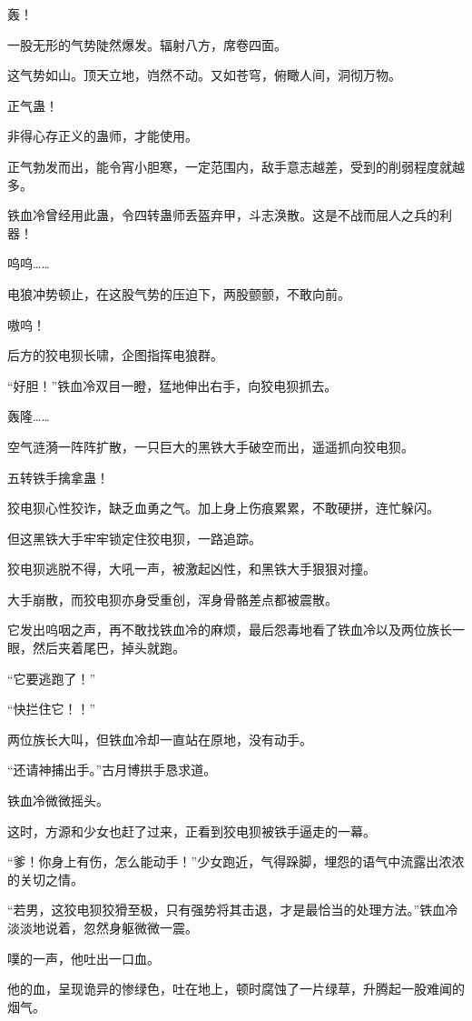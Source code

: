 \begin{this_body}
轰！

一股无形的气势陡然爆发。辐射八方，席卷四面。

这气势如山。顶天立地，岿然不动。又如苍穹，俯瞰人间，洞彻万物。

正气蛊！

非得心存正义的蛊师，才能使用。

正气勃发而出，能令宵小胆寒，一定范围内，敌手意志越差，受到的削弱程度就越多。

铁血冷曾经用此蛊，令四转蛊师丢盔弃甲，斗志涣散。这是不战而屈人之兵的利器！

呜呜……

电狼冲势顿止，在这股气势的压迫下，两股颤颤，不敢向前。

嗷呜！

后方的狡电狈长啸，企图指挥电狼群。

“好胆！”铁血冷双目一瞪，猛地伸出右手，向狡电狈抓去。

轰隆……

空气涟漪一阵阵扩散，一只巨大的黑铁大手破空而出，遥遥抓向狡电狈。

五转铁手擒拿蛊！

狡电狈心性狡诈，缺乏血勇之气。加上身上伤痕累累，不敢硬拼，连忙躲闪。

但这黑铁大手牢牢锁定住狡电狈，一路追踪。

狡电狈逃脱不得，大吼一声，被激起凶性，和黑铁大手狠狠对撞。

大手崩散，而狡电狈亦身受重创，浑身骨骼差点都被震散。

它发出呜咽之声，再不敢找铁血冷的麻烦，最后怨毒地看了铁血冷以及两位族长一眼，然后夹着尾巴，掉头就跑。

“它要逃跑了！”

“快拦住它！！”

两位族长大叫，但铁血冷却一直站在原地，没有动手。

“还请神捕出手。”古月博拱手恳求道。

铁血冷微微摇头。

这时，方源和少女也赶了过来，正看到狡电狈被铁手逼走的一幕。

“爹！你身上有伤，怎么能动手！”少女跑近，气得跺脚，埋怨的语气中流露出浓浓的关切之情。

“若男，这狡电狈狡猾至极，只有强势将其击退，才是最恰当的处理方法。”铁血冷淡淡地说着，忽然身躯微微一震。

噗的一声，他吐出一口血。

他的血，呈现诡异的惨绿色，吐在地上，顿时腐蚀了一片绿草，升腾起一股难闻的烟气。


\end{this_body}
